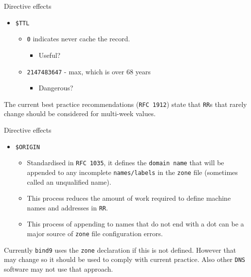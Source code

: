 \documentclass[aspectratio=169,xcolor=table]{beamer}
\begin{document}
\begin{frame}{Directive effects}
  \begin{itemize}
    \item \texttt{\$TTL}
      \begin{itemize}
        \item \texttt{0} indicates never cache the record.
          \begin{itemize}
            \item Useful?
          \end{itemize}
        \item \texttt{2147483647} - max, which is over 68 years
          \begin{itemize}
            \item Dangerous?
          \end{itemize}
      \end{itemize}
  \end{itemize}
  \begin{tcolorbox}[title={\textbf{NOTE:}}]
    The current best practice recommendations (\texttt{RFC 1912}) state that \texttt{RR}s that rarely change should be considered for multi-week values.
  \end{tcolorbox}
\end{frame}

\begin{frame}{Directive effects}
  \begin{itemize}
    \item \texttt{\$ORIGIN}
      \begin{itemize}
        \item Standardised in \texttt{RFC 1035}, it defines the \texttt{domain name} that will be appended to any incomplete \texttt{names/labels} in the \texttt{zone} file (sometimes called an unqualified name).
        \item This process reduces the amount of work required to define machine names and addresses in \texttt{RR}.
        \item This process of appending to names that do not end with a dot can be a major source of \texttt{zone} file configuration errors.
      \end{itemize}
  \end{itemize}
  \begin{tcolorbox}[title={\textbf{NOTE:}}]
    Currently \texttt{bind9} uses the \texttt{zone} declaration if this is not defined. However that may change so it should be used to comply with current practice. Also other \texttt{DNS} software may not use that approach.
  \end{tcolorbox}
\end{frame}
\end{document}
